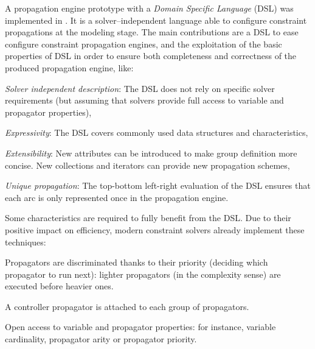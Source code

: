 A propagation engine prototype with a \textit{Domain Specific Language} (DSL) was implemented in \cite{Prudhomme2013}. It is a solver--independent language able to configure constraint propagations at the modeling stage. The main contributions are a DSL to ease configure constraint propagation engines, and the exploitation of the basic properties of DSL in order to ensure both completeness and correctness of the produced propagation engine, like:	
\begin{inparaenum}[i)]%
	\item {\it Solver independent description}: The DSL does not rely on specific solver requirements (but assuming that solvers provide full access to variable and propagator properties), 
	\item {\it Expressivity}: The DSL covers commonly used data structures and characteristics, 
	\item {\it Extensibility}: New attributes can be introduced to make group definition more concise. New collections and iterators can provide new propagation schemes, 
	\item {\it Unique propagation}: The top-bottom left-right evaluation of the DSL ensures that each arc is only represented once in the propagation engine.
\end{inparaenum}%

Some characteristics are required to fully benefit from the DSL. Due to their positive impact on efficiency, modern constraint solvers already implement these techniques:
\begin{inparaenum}[i)] %
	\item Propagators are discriminated thanks to their priority (deciding which propagator to run next): lighter propagators (in the complexity sense) are executed before heavier ones.
	\item A controller propagator is attached to each group of propagators.
	\item Open access to variable and propagator properties: for instance, variable cardinality, propagator arity or propagator priority.
\end{inparaenum}%

